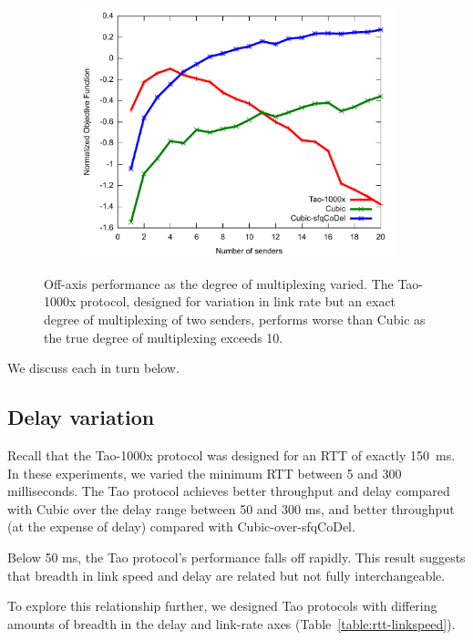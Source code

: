 \begin{figure}
\begin{subfigure}[b]{0.33\textwidth}
\includegraphics[width=\textwidth]{figures/muxing-agility-util.pdf}
\end{subfigure}
\caption{Off-axis performance as the degree of multiplexing
  varied. The Tao-1000x protocol, designed for variation in link rate but an
exact degree of multiplexing of two senders, performs worse than Cubic
as the true degree of multiplexing exceeds 10.}
\label{fig:multiplexing-agility}
\end{figure}

We discuss each in turn below.

\subsection{Delay variation}

Recall that the Tao-1000x protocol was designed for an RTT of exactly
150~ms. In these experiments, we varied the minimum RTT between 5 and
300 milliseconds. The Tao protocol achieves better throughput and
delay compared with Cubic over the delay range between 50 and 300 ms,
and better throughput (at the expense of delay) compared with
Cubic-over-sfqCoDel.

Below 50 ms, the Tao protocol's performance falls off rapidly.  This
result suggests that breadth in link speed and delay are related but
not fully interchangeable.

To explore this relationship further, we designed Tao protocols with
differing amounts of breadth in the delay and link-rate axes
(Table~\ref{table:rtt-linkspeed}).

